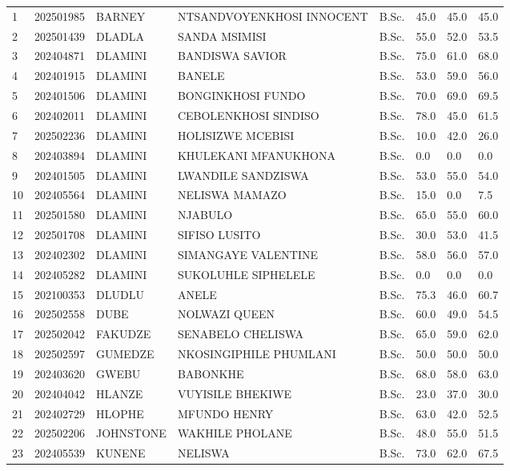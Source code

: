 \documentclass[12pt]{article}
\begin{document}
\begin{longtable}{@{}llllllll@{}}
1 & 202501985 & BARNEY & NTSANDVOYENKHOSI INNOCENT & B.Sc. & 45.0 & 45.0 & 45.0 \\
2 & 202501439 & DLADLA & SANDA MSIMISI & B.Sc. & 55.0 & 52.0 & 53.5 \\
3 & 202404871 & DLAMINI & BANDISWA SAVIOR & B.Sc. & 75.0 & 61.0 & 68.0 \\
4 & 202401915 & DLAMINI & BANELE & B.Sc. & 53.0 & 59.0 & 56.0 \\
5 & 202401506 & DLAMINI & BONGINKHOSI FUNDO & B.Sc. & 70.0 & 69.0 & 69.5 \\
6 & 202402011 & DLAMINI & CEBOLENKHOSI SINDISO & B.Sc. & 78.0 & 45.0 & 61.5 \\
7 & 202502236 & DLAMINI & HOLISIZWE MCEBISI & B.Sc. & 10.0 & 42.0 & 26.0 \\
8 & 202403894 & DLAMINI & KHULEKANI MFANUKHONA & B.Sc. & 0.0 & 0.0 & 0.0 \\
9 & 202401505 & DLAMINI & LWANDILE SANDZISWA & B.Sc. & 53.0 & 55.0 & 54.0 \\
10 & 202405564 & DLAMINI & NELISWA MAMAZO & B.Sc. & 15.0 & 0.0 & 7.5 \\
11 & 202501580 & DLAMINI & NJABULO & B.Sc. & 65.0 & 55.0 & 60.0 \\
12 & 202501708 & DLAMINI & SIFISO LUSITO & B.Sc. & 30.0 & 53.0 & 41.5 \\
13 & 202402302 & DLAMINI & SIMANGAYE VALENTINE & B.Sc. & 58.0 & 56.0 & 57.0 \\
14 & 202405282 & DLAMINI & SUKOLUHLE SIPHELELE & B.Sc. & 0.0 & 0.0 & 0.0 \\
15 & 202100353 & DLUDLU & ANELE & B.Sc. & 75.3 & 46.0 & 60.7 \\
16 & 202502558 & DUBE & NOLWAZI QUEEN & B.Sc. & 60.0 & 49.0 & 54.5 \\
17 & 202502042 & FAKUDZE & SENABELO CHELISWA & B.Sc. & 65.0 & 59.0 & 62.0 \\
18 & 202502597 & GUMEDZE & NKOSINGIPHILE PHUMLANI & B.Sc. & 50.0 & 50.0 & 50.0 \\
19 & 202403620 & GWEBU & BABONKHE & B.Sc. & 68.0 & 58.0 & 63.0 \\
20 & 202404042 & HLANZE & VUYISILE BHEKIWE & B.Sc. & 23.0 & 37.0 & 30.0 \\
21 & 202402729 & HLOPHE & MFUNDO HENRY & B.Sc. & 63.0 & 42.0 & 52.5 \\
22 & 202502206 & JOHNSTONE & WAKHILE PHOLANE & B.Sc. & 48.0 & 55.0 & 51.5 \\
23 & 202405539 & KUNENE & NELISWA & B.Sc. & 73.0 & 62.0 & 67.5 \\

\end{longtable}
\end{document}
